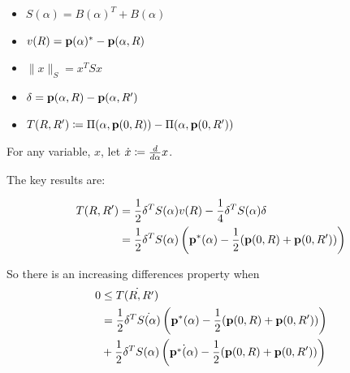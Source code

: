 

\newpage
\begin{itemize}
    \item $S(\alpha) = B(\alpha)^T + B(\alpha)$
    \item $v(R) = \mathbf{p}(\alpha)^* - \mathbf{p}(\alpha, R) $
    \item $\| x \|_S = x^T S x $
    \item $\delta = \mathbf{p}(\alpha, R) - \mathbf{p}(\alpha, R')$
    \item $T(R,R') \coloneqq \Pi(\alpha, \mathbf{p}(0,R)) -\Pi(\alpha, \mathbf{p}(0,R')) $
\end{itemize}

For any variable, $x$,  let $\dot{x} \coloneqq \frac{d}{d\alpha} x$. 

The key results are: 

\begin{align*}
    T(R,R') &= \frac{1}{2} \delta^T S(\alpha) v(R) - \frac{1}{4} \delta^T S(\alpha) \delta \\
    &= \frac{1}{2} \delta^T S(\alpha) \left(\mathbf{p}^*(\alpha) - \frac{1}{2}(\mathbf{p}(0,R) + \mathbf{p}(0,R')) \right)
\end{align*}

So there is an increasing differences property when 
\begin{align*}
    0 &\leq \dot{T(R,R')}\\
     &=  \frac{1}{2} \delta^T \dot{S(\alpha)} \left(\mathbf{p}^*(\alpha) - \frac{1}{2}(\mathbf{p}(0,R) + \mathbf{p}(0,R')) \right) \\
    &+  \frac{1}{2} \delta^T S(\alpha) \left(\dot{\mathbf{p}^*(\alpha)} - \frac{1}{2}(\mathbf{p}(0,R) + \mathbf{p}(0,R')) \right)
\end{align*}


